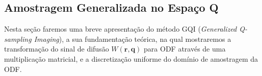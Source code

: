 \documentclass[
    12pt,                %
    oneside,            %
    a4paper,            %
    english,            %
    french,                %
    spanish,            %
    brazil                %
    ]{abntex2}
\begin{document}








\subsection{Amostragem Generalizada no Espaço Q}

Nesta seção faremos uma breve apresentação do método GQI (\textit{Generalized Q-sampling Imaging}), a sua fundamentação teórica, na qual mostraremos a transformação do sinal de difusão $W(\mathbf{r},\mathbf{q})$ para ODF através de uma multiplicação matricial, e a discretização uniforme do domínio de amostragem da ODF.

\end{document}
